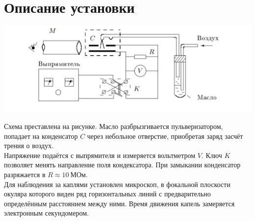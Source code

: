 \documentclass[a4paper,12pt]{article}
\begin{document}
\section*{Описание установки}
\begin{center}
\includegraphics[scale=0.6]{1.png}
\end{center}
Схема преставлена на рисунке. Масло разбрызгивается пульверизатором, попадает на конденсатор $C$ через небольное отверстие, приобретая заряд засчёт трения о воздух.\\
Напряжение подаётся с выпрямителя и измеряется вольтметром $V$. Ключ $K$ позволяет менять направление поля кондексатора. При замыкании конденсатор разряжается в $R \approx 10~\text{МОм}$.\\
Для наблюдения за каплями установлен микроскоп, в фокальной плоскости окуляра которого  виден ряд горизонтальных линий с предварительно определённым расстоянием между ними. Время движения капель замеряется электронным секундомером.
\end{document}
